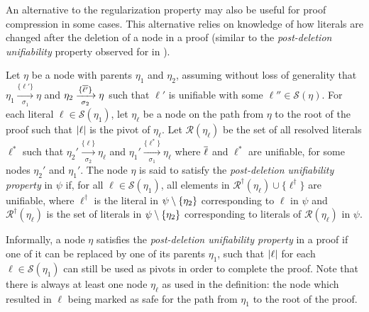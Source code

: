 An alternative to the regularization property may also be useful for proof compression in some cases. This alternative relies on knowledge of how literals are changed after the deletion of a node in a proof (similar to the \emph{post-deletion unifiability} property observed for {\FOLowerUnits} in \cite{GFOLU}).  
\begin{definition}\label{def:postdelprop}
Let $\eta$ be a node with parents $\eta_1$ and $\eta_2$, assuming without loss of generality that $\eta_1 \xrightarrow[\sigma_1]{\{\ell'\} } \eta$ and $\eta_2 \xrightarrow[\sigma_2]{\{\overline{\ell'}\} } \eta$ such that $\ell'$ is unifiable with some $\ell'' \in \mathcal{S}(\eta)$.
For each literal $\ell \in \mathcal{S}(\eta_1)$, let $\eta_\ell$ be a node on the path from $\eta$ to the root of the proof such that $\lvert\ell\rvert$ is the pivot of $\eta_\ell$.
Let $\mathcal{R}(\eta_\ell)$ be the set of all resolved literals $\ell^*$ such that $\eta_2' \xrightarrow[\sigma_2]{\{\ell\} } \eta_\ell$ and $\eta_1' \xrightarrow[\sigma_1]{\{\ell^*\} } \eta_\ell$ where $\overline{\ell}$ and $\ell^*$ are unifiable, for some nodes $\eta_2'$ and $\eta_1'$.
The node $\eta$ is said to satisfy the \emph{post-deletion unifiability property} in $\psi$ if, for all $\ell \in \mathcal{S}(\eta_1)$, all elements in $\mathcal{R}^{\dagger}(\eta_\ell) \cup \{\ell^{\dagger}\}$ are unifiable, where $\ell^{\dagger}$ is the literal in $\psi \setminus \{\eta_2\}$ corresponding to $\ell$ in $\psi$ and $\mathcal{R}^{\dagger}(\eta_\ell)$ is the set of literals in $\psi \setminus \{\eta_2\}$ corresponding to literals of $\mathcal{R}(\eta_\ell)$ in $\psi$.
\end{definition}



Informally, a node $\eta$ satisfies the \emph{post-deletion unifiability property} in a proof if one of it can be replaced by one of its parents $\eta_1$, such that $\lvert\ell\rvert$ for each $\ell \in \mathcal{S}(\eta_1)$ can still be used as pivots in order to complete the proof.
Note that there is always at least one node $\eta_\ell$ as used in the definition: the node which resulted in $\ell$ being marked as safe for the path from $\eta_1$ to the root of the proof.


